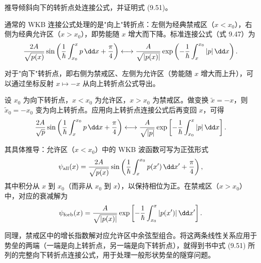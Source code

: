 \begin{question}
推导倾斜向下的转折点处连接公式，并证明式 (9.51)。

\par\smallskip
{}

\end{question}
\begin{solution}
通常的 WKB 连接公式处理的是"向上"转折点：左侧为经典禁戒区（$x<x_0$），右侧为经典允许区（$x>x_0$），即势能随 $x$ 增大而下降。标准连接公式（式 9.47）为
\[
{2A\over\sqrt{p(x)}}\sin\left({1\over\hbar}\int_{x_0}^{x}p\,\dd x+{\pi\over4}\right)
\longleftrightarrow
{A\over\sqrt{|p(x)|}}\exp\left(-{1\over\hbar}\int_{x}^{x_0}|p|\,\dd x\right).
\]

对于"向下"转折点，即右侧为禁戒区、左侧为允许区（势能随 $x$ 增大而上升），可以通过坐标反射 $x\mapsto -x$ 从向上转折点公式导出。

设 $x_0$ 为向下转折点，$x<x_0$ 为允许区，$x>x_0$ 为禁戒区。做变换 $\tilde x=-x$，则 $\tilde x_0=-x_0$ 变为向上转折点。应用向上转折点连接公式后再变回 $x$，可得
\[
{2A\over\sqrt p}\sin\left({1\over\hbar}\int_x^{x_0}p\,\dd x+{\pi\over4}\right)
\longleftrightarrow
{A\over\sqrt{|p|}}\exp\left[-{1\over\hbar}\int_{x_0}^{x}|p|\,\dd x\right].
\]

其具体推导：允许区（$x<x_0$）中的 WKB 波函数可写为正弦形式
\[
\psi_{\text{all}}(x)={2A\over\sqrt{p(x)}}\sin\left({1\over\hbar}\int_x^{x_0}p(x')\,\dd x'+{\pi\over4}\right),
\]
其中积分从 $x$ 到 $x_0$（而非从 $x_0$ 到 $x$），以保持相位为正。在禁戒区（$x>x_0$）中，对应的衰减解为
\[
\psi_{\text{forb}}(x)={A\over\sqrt{|p(x)|}}\exp\left[-{1\over\hbar}\int_{x_0}^{x}|p(x')|\,\dd x'\right].
\]

同理，禁戒区中的增长指数解对应允许区中余弦型组合。将这两条线性关系应用于势垒的两端（一端是向上转折点，另一端是向下转折点），就得到书中式 (9.51) 所列的完整向下转折点连接公式，用于处理一般形状势垒的隧穿问题。
\end{solution}

